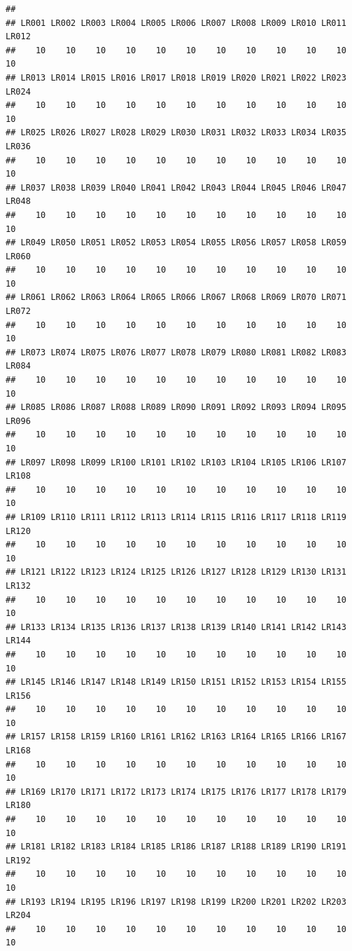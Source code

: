 \documentclass[]{book}
\begin{document}
\begin{verbatim}
## 
## LR001 LR002 LR003 LR004 LR005 LR006 LR007 LR008 LR009 LR010 LR011 LR012 
##    10    10    10    10    10    10    10    10    10    10    10    10 
## LR013 LR014 LR015 LR016 LR017 LR018 LR019 LR020 LR021 LR022 LR023 LR024 
##    10    10    10    10    10    10    10    10    10    10    10    10 
## LR025 LR026 LR027 LR028 LR029 LR030 LR031 LR032 LR033 LR034 LR035 LR036 
##    10    10    10    10    10    10    10    10    10    10    10    10 
## LR037 LR038 LR039 LR040 LR041 LR042 LR043 LR044 LR045 LR046 LR047 LR048 
##    10    10    10    10    10    10    10    10    10    10    10    10 
## LR049 LR050 LR051 LR052 LR053 LR054 LR055 LR056 LR057 LR058 LR059 LR060 
##    10    10    10    10    10    10    10    10    10    10    10    10 
## LR061 LR062 LR063 LR064 LR065 LR066 LR067 LR068 LR069 LR070 LR071 LR072 
##    10    10    10    10    10    10    10    10    10    10    10    10 
## LR073 LR074 LR075 LR076 LR077 LR078 LR079 LR080 LR081 LR082 LR083 LR084 
##    10    10    10    10    10    10    10    10    10    10    10    10 
## LR085 LR086 LR087 LR088 LR089 LR090 LR091 LR092 LR093 LR094 LR095 LR096 
##    10    10    10    10    10    10    10    10    10    10    10    10 
## LR097 LR098 LR099 LR100 LR101 LR102 LR103 LR104 LR105 LR106 LR107 LR108 
##    10    10    10    10    10    10    10    10    10    10    10    10 
## LR109 LR110 LR111 LR112 LR113 LR114 LR115 LR116 LR117 LR118 LR119 LR120 
##    10    10    10    10    10    10    10    10    10    10    10    10 
## LR121 LR122 LR123 LR124 LR125 LR126 LR127 LR128 LR129 LR130 LR131 LR132 
##    10    10    10    10    10    10    10    10    10    10    10    10 
## LR133 LR134 LR135 LR136 LR137 LR138 LR139 LR140 LR141 LR142 LR143 LR144 
##    10    10    10    10    10    10    10    10    10    10    10    10 
## LR145 LR146 LR147 LR148 LR149 LR150 LR151 LR152 LR153 LR154 LR155 LR156 
##    10    10    10    10    10    10    10    10    10    10    10    10 
## LR157 LR158 LR159 LR160 LR161 LR162 LR163 LR164 LR165 LR166 LR167 LR168 
##    10    10    10    10    10    10    10    10    10    10    10    10 
## LR169 LR170 LR171 LR172 LR173 LR174 LR175 LR176 LR177 LR178 LR179 LR180 
##    10    10    10    10    10    10    10    10    10    10    10    10 
## LR181 LR182 LR183 LR184 LR185 LR186 LR187 LR188 LR189 LR190 LR191 LR192 
##    10    10    10    10    10    10    10    10    10    10    10    10 
## LR193 LR194 LR195 LR196 LR197 LR198 LR199 LR200 LR201 LR202 LR203 LR204 
##    10    10    10    10    10    10    10    10    10    10    10    10 

\end{verbatim}
\end{document}
